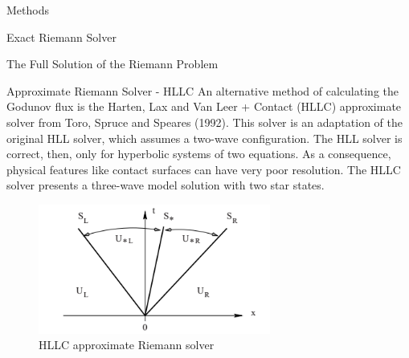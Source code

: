 \begin{section}{Methods}
\begin{subsection}{Exact Riemann Solver}
\begin{subsubsection}{The Full Solution of the Riemann Problem}
\end{subsubsection}

\end{subsection}

\begin{subsection}{Approximate Riemann Solver - HLLC}
An alternative method of calculating the Godunov flux is the Harten, Lax and Van Leer + Contact (HLLC) approximate solver from Toro, Spruce and Speares (1992). This solver is an adaptation of the original HLL solver, which assumes a two-wave configuration. The HLL solver is correct, then, only for hyperbolic systems of two equations. As a consequence, physical features like contact surfaces can have very poor resolution. The HLLC solver presents a three-wave model solution with two star states.\\
\begin{figure}[ht]
\centering
\includegraphics[width=3in]{hllcSoln}
\caption{HLLC approximate Riemann solver}
\end{figure}


\end{subsection}
\end{section}
